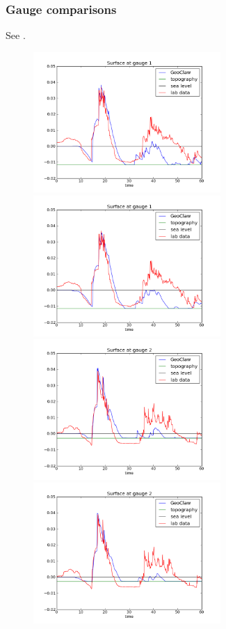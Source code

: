 \subsubsection{Gauge comparisons}

See .

\begin{figure}[ht]
\hfil\includegraphics[width=2.8in]{bp7/figs423/gauge0001fig300.png}\hfil
\hfil\includegraphics[width=2.8in]{bp7/figs160/gauge0001fig300.png}\hfil
\vskip 5pt
\hfil\includegraphics[width=2.8in]{bp7/figs423/gauge0002fig300.png}\hfil
\hfil\includegraphics[width=2.8in]{bp7/figs160/gauge0002fig300.png}\hfil

\end{figure}
